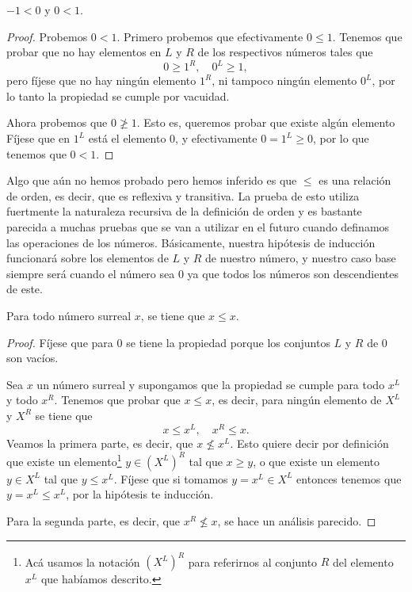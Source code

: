     \begin{theorem}
        $-1 < 0$ y $0 < 1$.
    \end{theorem}

    \begin{proof}
        Probemos $0 < 1$. Primero probemos que efectivamente $0\le 1$. Tenemos que probar que no hay elementos en $L$ y $R$ de los respectivos n\'umeros tales que
        \[
            0 \ge 1^R, \quad 0^L \ge 1,
        \]
        pero f\'ijese que no hay ningún elemento $1^R$, ni tampoco ningún elemento $0^L$, por lo tanto la propiedad se cumple por vacuidad.

        Ahora probemos que $0 \not\ge 1$. Esto es, queremos probar que existe alg\'un elemento F\'ijese que en $1^L$ est\'a el elemento $0$, y efectivamente $0 = 1^L \ge 0$, por lo que tenemos que $0 < 1$.
    \end{proof}

    Algo que a\'un no hemos probado pero hemos inferido es que $\le$ es una relaci\'on de orden, es decir, que es reflexiva y transitiva. La prueba de esto utiliza fuertmente la naturaleza recursiva de la definici\'on de orden y es bastante parecida a muchas pruebas que se van a utilizar en el futuro cuando definamos las operaciones de los n\'umeros. B\'asicamente, nuestra hip\'otesis de inducci\'on funcionar\'a sobre los elementos de $L$ y $R$ de nuestro n\'umero, y nuestro caso base siempre ser\'a cuando el n\'umero sea $0$ ya que todos los n\'umeros son descendientes de este.

    \begin{theorem}[Reflexividad]
        Para todo n\'umero surreal $x$, se tiene que $x\le x$.
    \end{theorem}

    \begin{proof}
        F\'ijese que para $0$ se tiene la propiedad porque los conjuntos $L$ y $R$ de $0$ son vac\'ios.

        Sea $x$ un n\'umero surreal y supongamos que la propiedad se cumple para todo $x^L$ y todo $x^R$. Tenemos que probar que $x\le x$, es decir, para ning\'un elemento de $X^L$ y $X^R$ se tiene que
        \[
            x \le x^L, \quad x^R \le x.
        \]
        Veamos la primera parte, es decir, que $x \not\le x^L$. Esto quiere decir por definici\'on que existe un elemento\footnote{Ac\'a usamos la notaci\'on $(X^L)^R$ para referirnos al conjunto $R$ del elemento $x^L$ que hab\'iamos descrito.} $y\in (X^L)^R$  tal que $x \ge y$, o que existe un elemento $y \in X^L$ tal que $y \le x^L$. F\'ijese que si tomamos $y = x^L \in X^L$ entonces tenemos que $y = x^L \le x^L$, por la hip\'otesis te inducci\'on.

        Para la segunda parte, es decir, que $x^R \not\le x$, se hace un an\'alisis parecido.
    \end{proof}
    
